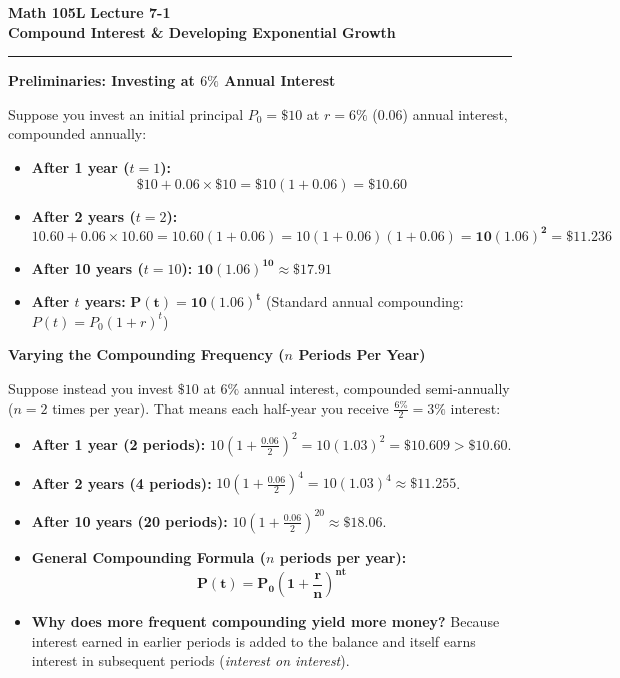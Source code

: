 \documentclass[10.5pt]{article}
\begin{document}
\noindent \textbf{\large Math 105L} \hfill \textbf{\large Lecture 7-1}\\[1pt]
{\textbf{\Large Compound Interest \& Developing Exponential Growth}}\\[-5pt]
\rule{\textwidth}{1.2pt}

\vspace{0.03in}

\textbf{\large Preliminaries: Investing at $6\%$ Annual Interest}

Suppose you invest an initial principal $P_0 = \$10$ at $r = 6\%$ ($0.06$) annual interest, compounded annually:
\begin{itemize}[leftmargin=1.2em, topsep=1pt, itemsep=2pt]
  \item \textbf{After 1 year ($t=1$):}
  \[
    \$10 + 0.06 \times \$10 = \$10(1 + 0.06) = \mathbf{\$10.60}
  \]
  \item \textbf{After 2 years ($t=2$):}
  \[
    10.60 + 0.06 \times 10.60 = 10.60(1 + 0.06) = 10(1 + 0.06)(1 + 0.06) = \mathbf{10(1.06)^2 = \$11.236}
  \]
  \item \textbf{After 10 years ($t=10$):} $\mathbf{10(1.06)^{10} \approx \$17.91}$
  \item \textbf{After $t$ years:} $\mathbf{P(t) = 10(1.06)^t}$ \quad (Standard annual compounding: $P(t) = P_0 (1 + r)^t$)
\end{itemize}

\vspace{0.03in}

\textbf{\large Varying the Compounding Frequency ($n$ Periods Per Year)}

Suppose instead you invest $\$10$ at $6\%$ annual interest, compounded semi-annually ($n = 2$ times per year). That means each half-year you receive $\frac{6\%}{2} = 3\%$ interest:
\begin{itemize}[leftmargin=1.2em, topsep=1pt, itemsep=2pt]
  \item \textbf{After 1 year (2 periods):} $10\left(1 + \frac{0.06}{2}\right)^2 = 10(1.03)^2 = \$10.609 > \$10.60$.
  \item \textbf{After 2 years (4 periods):} $10\left(1 + \frac{0.06}{2}\right)^4 = 10(1.03)^4 \approx \$11.255$.
  \item \textbf{After 10 years (20 periods):} $10\left(1 + \frac{0.06}{2}\right)^{20} \approx \$18.06$.
  \item \textbf{General Compounding Formula ($n$ periods per year):}
  \[
    \mathbf{P(t) = P_0 \left(1 + \frac{r}{n}\right)^{nt}}
  \]
  \item \textbf{Why does more frequent compounding yield more money?}
  Because interest earned in earlier periods is added to the balance and itself earns interest in subsequent periods (\textit{interest on interest}).
\end{itemize}
\end{document}
